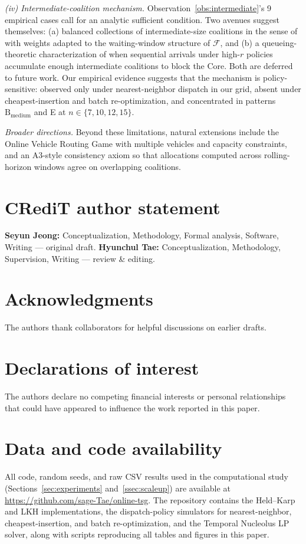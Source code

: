 \documentclass[11pt]{article}
\theoremstyle{plain}
\theoremstyle{definition}
\theoremstyle{remark}
\newcommand{\F}{\mathcal{F}}
\begin{document}
\emph{(iv) Intermediate-coalition mechanism.} Observation~\ref{obs:intermediate}'s 9 empirical cases call for an analytic sufficient condition. Two avenues suggest themselves: (a) balanced collections of intermediate-size coalitions in the sense of \citet{shapley1971core} with weights adapted to the waiting-window structure of $\F$, and (b) a queueing-theoretic characterization of when sequential arrivals under high-$r$ policies accumulate enough intermediate coalitions to block the Core. Both are deferred to future work. Our empirical evidence suggests that the mechanism is policy-sensitive: observed only under nearest-neighbor dispatch in our grid, absent under cheapest-insertion and batch re-optimization, and concentrated in patterns $\text{B}_{\text{medium}}$ and E at $n\in\{7,10,12,15\}$.

\emph{Broader directions.} Beyond these limitations, natural extensions include the Online Vehicle Routing Game with multiple vehicles and capacity constraints, and an A3-style consistency axiom so that allocations computed across rolling-horizon windows agree on overlapping coalitions.

\section*{CRediT author statement}
\textbf{Seyun Jeong:} Conceptualization, Methodology, Formal analysis, Software, Writing --- original draft. \textbf{Hyunchul Tae:} Conceptualization, Methodology, Supervision, Writing --- review \& editing.

\section*{Acknowledgments}
The authors thank collaborators for helpful discussions on earlier drafts.

\section*{Declarations of interest}
The authors declare no competing financial interests or personal relationships that could have appeared to influence the work reported in this paper.

\section*{Data and code availability}
All code, random seeds, and raw CSV results used in the computational study (Sections~\ref{sec:experiments} and~\ref{ssec:scaleup}) are available at \url{https://github.com/sage-Tae/online-tsg}. The repository contains the Held--Karp and LKH implementations, the dispatch-policy simulators for nearest-neighbor, cheapest-insertion, and batch re-optimization, and the Temporal Nucleolus LP solver, along with scripts reproducing all tables and figures in this paper.

\setlength{\bibsep}{0pt plus 0.3ex}


\end{document}
